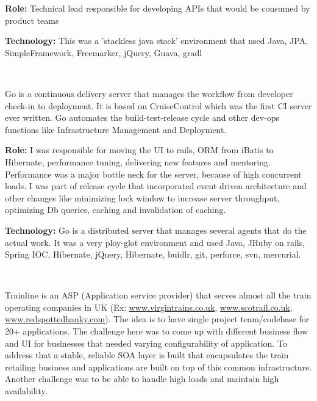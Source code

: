 \begin{resume}
\begin{position}
{\textbf{Role:}} Technical lead responsible for developing APIs that would be consumed by product teams

{\textbf{Technology:}} This was a 'stackless java stack' environment that used Java, JPA, SimpleFramework, Freemarker, jQuery, Guava, gradl
\end{position}\\

\begin{position}
Go is a continuous delivery server that manages the workflow from developer check-in to deployment. It is based on CruiseControl which was the first CI server ever written. Go automates the build-test-release cycle and other dev-ops functions like Infrastructure Management and Deployment.

{\textbf{Role:}} I was responsible for moving the UI to rails, ORM from iBatis to Hibernate, performance tuning, delivering new features and mentoring. Performance was a major bottle neck for the server, because of high concurrent loads. I was part of release cycle that incorporated event driven architecture and other changes like minimizing lock window to increase server throughput, optimizing Db queries, caching and invalidation of caching. 

{\textbf{Technology:}} Go is a distributed server that manages several agents that do the actual work. It was a very ploy-glot environment and used Java, JRuby on rails, Spring IOC, Hibernate, jQuery, Hibernate, buidlr, git, perforce, svn, mercurial.
\end{position}\\


\begin{position}
Trainline is an ASP (Application service provider) that serves almost all the train operating companies in UK (Ex: \url{www.virgintrains.co.uk}, \url{www.scotrail.co.uk}, \url{www.redspottedhanky.com}). The idea is to have single project team/codebase for 20+ applications. The challenge here was to come up with different business flow and UI for businesses that needed varying configurability of application. To address that a stable, reliable SOA layer is built that encapsulates the train retailing business and applications are built on top of this common infrastructure. Another challenge was to be able to handle high loads and maintain high availability.


\end{position}
\end{resume}
